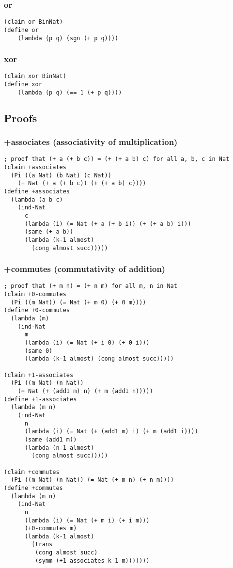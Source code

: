\subsubsection{or} \label{code:or}
\begin{verbatim}
(claim or BinNat)
(define or
    (lambda (p q) (sgn (+ p q))))
\end{verbatim}

\subsubsection{xor} \label{code:xor}
\begin{verbatim}
(claim xor BinNat)
(define xor
    (lambda (p q) (== 1 (+ p q))))
\end{verbatim}


\subsection{Proofs}

\subsubsection{+associates (associativity of multiplication)} \label{code:+associates}
\begin{verbatim}
; proof that (+ a (+ b c)) = (+ (+ a b) c) for all a, b, c in Nat
(claim +associates
  (Pi ((a Nat) (b Nat) (c Nat))
    (= Nat (+ a (+ b c)) (+ (+ a b) c))))
(define +associates
  (lambda (a b c)
    (ind-Nat
      c
      (lambda (i) (= Nat (+ a (+ b i)) (+ (+ a b) i)))
      (same (+ a b))
      (lambda (k-1 almost)
        (cong almost succ)))))
\end{verbatim}

\subsubsection{+commutes (commutativity of addition)} \label{code:+commutes}
\begin{verbatim}
; proof that (+ m n) = (+ n m) for all m, n in Nat
(claim +0-commutes
  (Pi ((m Nat)) (= Nat (+ m 0) (+ 0 m))))
(define +0-commutes
  (lambda (m)
    (ind-Nat
      m
      (lambda (i) (= Nat (+ i 0) (+ 0 i)))
      (same 0)
      (lambda (k-1 almost) (cong almost succ)))))

(claim +1-associates
  (Pi ((m Nat) (n Nat))
    (= Nat (+ (add1 m) n) (+ m (add1 n)))))
(define +1-associates
  (lambda (m n)
    (ind-Nat
      n
      (lambda (i) (= Nat (+ (add1 m) i) (+ m (add1 i))))
      (same (add1 m))
      (lambda (n-1 almost)
        (cong almost succ)))))

(claim +commutes
  (Pi ((m Nat) (n Nat)) (= Nat (+ m n) (+ n m))))
(define +commutes
  (lambda (m n)
    (ind-Nat
      n
      (lambda (i) (= Nat (+ m i) (+ i m)))
      (+0-commutes m)
      (lambda (k-1 almost)
        (trans
         (cong almost succ)
         (symm (+1-associates k-1 m)))))))
\end{verbatim}

